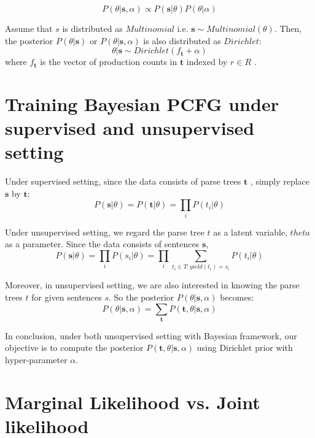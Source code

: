 \documentclass[11pt]{article}
\begin{document}
$$
P(\theta|\boldsymbol{s}, \alpha) \propto P(\boldsymbol{s}|\theta) P(\theta | \alpha)
$$


Assume that $s$ is distributed as $Multinomial$ i.e. $\boldsymbol{s} \sim Multinomial(\theta)$. Then, the posterior $P(\theta|\boldsymbol{s})$ or $P(\theta|\boldsymbol{s}, \alpha)$ is also distributed as $Dirichlet$:
$$
\theta|\boldsymbol{s} \sim Dirichlet(f_{\boldsymbol{t}} + \alpha)
$$
where $f_{\boldsymbol{t}}$ is the vector of production counts in $\boldsymbol{t}$ indexed by $r \in R$ \cite{johnson-griffiths-goldwater:2007:main}.

\section{Training Bayesian PCFG under supervised and unsupervised setting}

Under supervised setting, since the data consists of parse trees $\boldsymbol{t}$ \cite{cohen-johnson:2013:ACL2013}, simply replace $\boldsymbol{s}$ by $\boldsymbol{t}$:
$$
P(\boldsymbol{s}|\theta) =  P(\boldsymbol{t}|\theta) = \prod_i P(t_i | \theta)
$$

Under unsupervised setting, we regard the parse tree $t$ as a latent variable, $theta$ as a parameter. Since the data consists of sentences $\boldsymbol{s}$,
$$
P(\boldsymbol{s}|\theta) = \prod_i P(s_i | \theta) = \prod_i \sum_{t_i \in T: yield(t_i) = s_i} P(t_i | \theta)
$$




Moreover, in unsupervised setting, we are also interested in knowing the parse trees $t$ for given sentences $s$. So the posterior $P(\theta|\boldsymbol{s}, \alpha)$ becomes:
$$
P(\theta|\boldsymbol{s}, \alpha) = \sum_{\boldsymbol{t}} P(\boldsymbol{t}, \theta | \boldsymbol{s}, \alpha) 
$$

In conclusion, under both unsupervised setting with Bayesian framework, our objective is to compute the posterior $P(\boldsymbol{t}, \theta | \boldsymbol{s}, \alpha)$ using Dirichlet prior with hyper-parameter $\alpha$.

\section{Marginal Likelihood vs. Joint likelihood}
\end{document}
